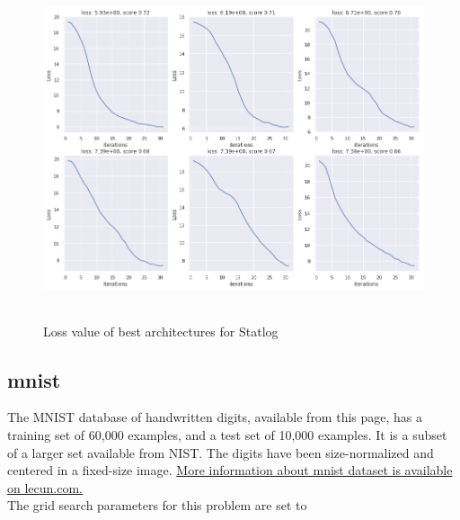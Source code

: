 \documentclass[10pt]{SelfArx} %
\begin{document}
\begin{figure}\centering
	\includegraphics[width=1.79\columnwidth, height=10cm]{img/statlog-plots1}
	\caption{Loss value of best architectures for Statlog}
	\label{fsatlog}
\end{figure}

\subsection{mnist}
The MNIST database of handwritten digits, available from this page, has a training set of 60,000 examples, and a test set of 10,000 examples. It is a subset of a larger set available from NIST. The digits have been size-normalized and centered in a fixed-size image. \href{http://yann.lecun.com/exdb/mnist/}{More information about mnist dataset is available on lecun.com.}
\\
The grid search parameters for this problem are set to
\end{document}
